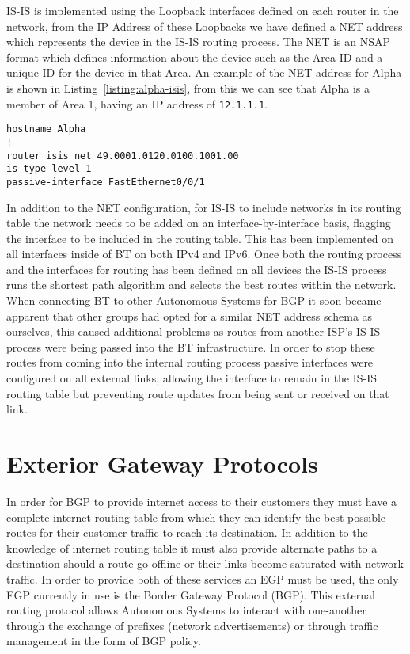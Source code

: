 IS-IS is implemented using the Loopback interfaces defined on each router in the
network, from the IP Address of these Loopbacks we have defined a NET address
which represents the device in the IS-IS routing process. The NET is an NSAP
format which defines information about the device such as the Area ID and a
unique ID for the device in that Area. An example of the NET address for Alpha
is shown in Listing~\ref{listing:alpha-isis}, from this we can see that Alpha is
a member of Area 1, having an IP address of \texttt{12.1.1.1}.

\begin{lstlisting}[caption={Alpha IS-IS Configuration}, label={listing:alpha-isis}]
hostname Alpha
!
router isis net 49.0001.0120.0100.1001.00
is-type level-1
passive-interface FastEthernet0/0/1
\end{lstlisting}

In addition to the NET configuration, for IS-IS to include networks in its
routing table the network needs to be added on an interface-by-interface basis,
flagging the interface to be included in the routing table. This has been
implemented on all interfaces inside of BT on both IPv4 and IPv6. Once both the
routing process and the interfaces for routing has been defined on all devices
the IS-IS process runs the shortest path algorithm and selects the best routes
within the network. When connecting BT to other Autonomous Systems for BGP it
soon became apparent that other groups had opted for a similar NET address
schema as ourselves, this caused additional problems as routes from another
ISP's IS-IS process were being passed into the BT infrastructure. In order to
stop these routes from coming into the internal routing process passive
interfaces were configured on all external links, allowing the interface to
remain in the IS-IS routing table but preventing route updates from being sent
or received on that link.

\section{Exterior Gateway Protocols} In order for BGP to provide internet access
to their customers they must have a complete internet routing table from which
they can identify the best possible routes for their customer traffic to reach
its destination. In addition to the knowledge of internet routing table it must
also provide alternate paths to a destination should a route go offline or their
links become saturated with network traffic. In order to provide both of these
services an EGP must be used, the only EGP currently in use is the Border
Gateway Protocol (BGP). This external routing protocol allows Autonomous Systems
to interact with one-another through the exchange of prefixes (network
advertisements) or through traffic management in the form of BGP policy.

